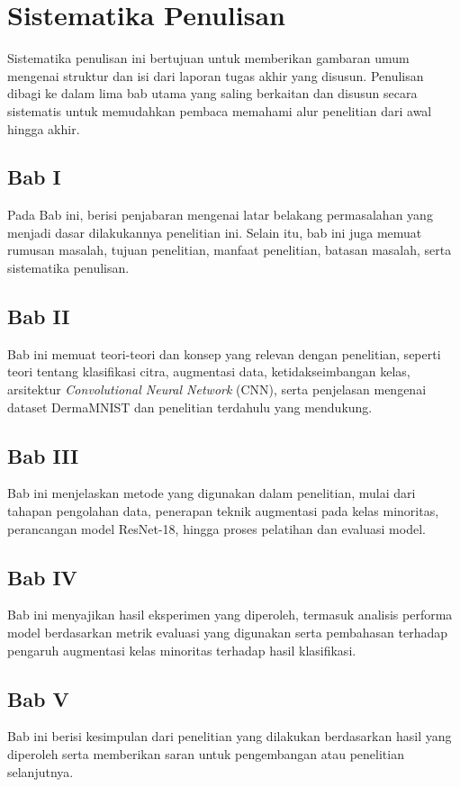

\section{Sistematika Penulisan} \label{I.Sistematika}
Sistematika penulisan ini bertujuan untuk memberikan 
gambaran umum mengenai struktur dan isi dari laporan 
tugas akhir yang disusun. Penulisan dibagi ke dalam 
lima bab utama yang saling berkaitan dan disusun 
secara sistematis untuk memudahkan pembaca memahami 
alur penelitian dari awal hingga akhir. \par

\subsection*{Bab I}
Pada Bab ini, berisi penjabaran mengenai latar belakang 
permasalahan yang menjadi dasar dilakukannya penelitian 
ini. Selain itu, bab ini juga memuat rumusan masalah, 
tujuan penelitian, manfaat penelitian, batasan masalah, 
serta sistematika penulisan.

\subsection*{Bab II}
Bab ini memuat teori-teori dan konsep yang relevan dengan 
penelitian, seperti teori tentang klasifikasi citra, 
augmentasi data, ketidakseimbangan kelas, arsitektur 
\textit{Convolutional Neural Network} (CNN), serta penjelasan 
mengenai dataset DermaMNIST dan penelitian terdahulu yang mendukung.

\subsection*{Bab III}
Bab ini menjelaskan metode yang digunakan dalam penelitian, 
mulai dari tahapan pengolahan data, penerapan teknik augmentasi 
pada kelas minoritas, perancangan model ResNet-18, hingga 
proses pelatihan dan evaluasi model.

\subsection*{Bab IV}
Bab ini menyajikan hasil eksperimen yang diperoleh, termasuk 
analisis performa model berdasarkan metrik evaluasi yang 
digunakan serta pembahasan terhadap pengaruh augmentasi kelas 
minoritas terhadap hasil klasifikasi.

\subsection*{Bab V}
Bab ini berisi kesimpulan dari penelitian yang dilakukan 
berdasarkan hasil yang diperoleh serta memberikan saran 
untuk pengembangan atau penelitian selanjutnya.
